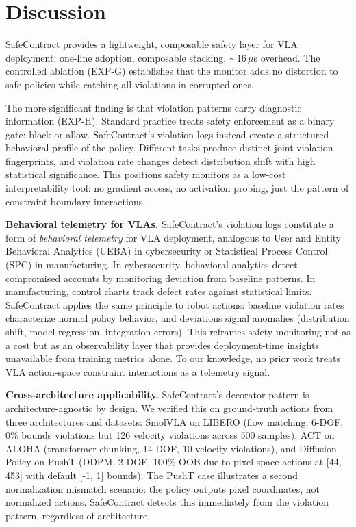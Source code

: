 \documentclass[conference]{IEEEtran}
\begin{document}
\section{Discussion}

SafeContract provides a lightweight, composable safety layer for VLA deployment: one-line adoption, composable stacking, ${\sim}$16\,$\mu$s overhead.
The controlled ablation (EXP-G) establishes that the monitor adds no distortion to safe policies while catching all violations in corrupted ones.

The more significant finding is that violation patterns carry diagnostic information (EXP-H).
Standard practice treats safety enforcement as a binary gate: block or allow.
SafeContract's violation logs instead create a structured behavioral profile of the policy.
Different tasks produce distinct joint-violation fingerprints, and violation rate changes detect distribution shift with high statistical significance.
This positions safety monitors as a low-cost interpretability tool: no gradient access, no activation probing, just the pattern of constraint boundary interactions.

\textbf{Behavioral telemetry for VLAs.}
SafeContract's violation logs constitute a form of \emph{behavioral telemetry} for VLA deployment, analogous to User and Entity Behavioral Analytics (UEBA) in cybersecurity or Statistical Process Control (SPC) in manufacturing.
In cybersecurity, behavioral analytics detect compromised accounts by monitoring deviation from baseline patterns.
In manufacturing, control charts track defect rates against statistical limits.
SafeContract applies the same principle to robot actions: baseline violation rates characterize normal policy behavior, and deviations signal anomalies (distribution shift, model regression, integration errors).
This reframes safety monitoring not as a cost but as an observability layer that provides deployment-time insights unavailable from training metrics alone.
To our knowledge, no prior work treats VLA action-space constraint interactions as a telemetry signal.

\textbf{Cross-architecture applicability.}
SafeContract's decorator pattern is architecture-agnostic by design.
We verified this on ground-truth actions from three architectures and datasets:
SmolVLA on LIBERO (flow matching, 6-DOF, 0\% bounds violations but 126 velocity violations across 500 samples),
ACT on ALOHA (transformer chunking, 14-DOF, 10 velocity violations),
and Diffusion Policy on PushT (DDPM, 2-DOF, 100\% OOB due to pixel-space actions at [44, 453] with default [-1, 1] bounds).
The PushT case illustrates a second normalization mismatch scenario: the policy outputs pixel coordinates, not normalized actions.
SafeContract detects this immediately from the violation pattern, regardless of architecture.
\end{document}
